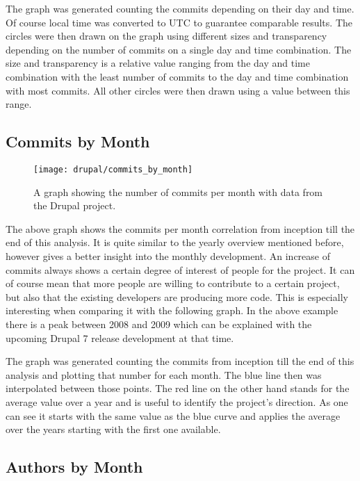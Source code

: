 The graph was generated counting the commits depending on their day and time.
Of course local time was converted to \ac{UTC} to guarantee comparable results.
The circles were then drawn on the graph using different sizes and transparency
depending on the number of commits on a single day and time combination. The
size and transparency is a relative value ranging from the day and time
combination with the least number of commits to the day and time combination
with most commits. All other circles were then drawn using a value between this
range.


\subsection{Commits by Month} %

\begin{figure}[h!t]
  \centering
  \texttt{[image: drupal/commits\_by\_month]}
  \caption[The Commits by Month Graph]
  {A graph showing the number of commits per month with data from the Drupal
    project.}
\end{figure}

The above graph shows the commits per month correlation from inception till the
end of this analysis. It is quite similar to the yearly overview mentioned
before, however gives a better insight into the monthly development. An
increase of commits always shows a certain degree of interest of people for the
project. It can of course mean that more people are willing to contribute to a
certain project, but also that the existing developers are producing more code.
This is especially interesting when comparing it with the following graph. In
the above example there is a peak between 2008 and 2009 which can be explained
with the upcoming Drupal 7 release development at that time.

The graph was generated counting the commits from inception till the end of
this analysis and plotting that number for each month. The blue line then was
interpolated between those points. The red line on the other hand stands for
the average value over a year and is useful to identify the project's
direction. As one can see it starts with the same value as the blue curve and
applies the average over the years starting with the first one available.


\subsection{Authors by Month} %


